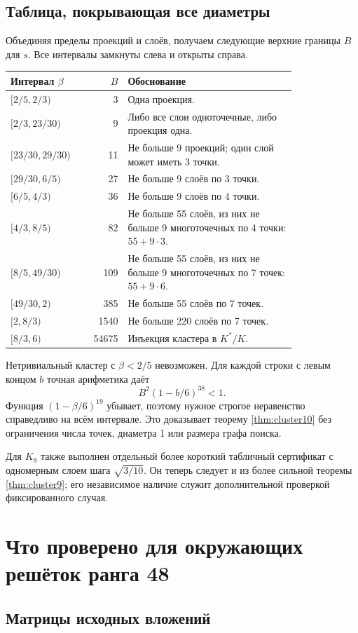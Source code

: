 \documentclass[11pt,a4paper]{article}
\theoremstyle{remark}\newtheorem{remark}[theorem]{Замечание}
\begin{document}
\subsection{Таблица, покрывающая все диаметры}

Объединяя пределы проекций и слоёв, получаем следующие верхние границы $B$ для $s$. Все интервалы замкнуты слева и открыты справа.
\begin{longtable}{P{0.22\linewidth}rP{0.59\linewidth}}
\toprule
Интервал $\beta$ &$B$&Обоснование\\\midrule
\endhead
$[2/5,2/3)$&3&Одна проекция.\\
$[2/3,23/30)$&9&Либо все слои одноточечные, либо проекция одна.\\
$[23/30,29/30)$&11&Не больше 9 проекций; один слой может иметь 3 точки.\\
$[29/30,6/5)$&27&Не больше 9 слоёв по 3 точки.\\
$[6/5,4/3)$&36&Не больше 9 слоёв по 4 точки.\\
$[4/3,8/5)$&82&Не больше 55 слоёв, из них не больше 9 многоточечных по 4 точки: $55+9\cdot3$.\\
$[8/5,49/30)$&109&Не больше 55 слоёв, из них не больше 9 многоточечных по 7 точек: $55+9\cdot6$.\\
$[49/30,2)$&385&Не больше 55 слоёв по 7 точек.\\
$[2,8/3)$&1540&Не больше 220 слоёв по 7 точек.\\
$[8/3,6)$&54675&Инъекция кластера в $K^*/K$.\\
\bottomrule
\end{longtable}
Нетривиальный кластер с $\beta<2/5$ невозможен. Для каждой строки с левым концом $b$ точная арифметика даёт
\[
B^2(1-b/6)^{38}<1.
\]
Функция $(1-\beta/6)^{19}$ убывает, поэтому нужное строгое неравенство справедливо на всём интервале. Это доказывает теорему \ref{thm:cluster10} без ограничения числа точек, диаметра 1 или размера графа поиска.

Для $K_9$ также выполнен отдельный более короткий табличный сертификат с одномерным слоем шага $\sqrt{3/10}$. Он теперь следует и из более сильной теоремы \ref{thm:cluster9}; его независимое наличие служит дополнительной проверкой фиксированного случая.

\section{Что проверено для окружающих решёток ранга 48}

\subsection{Матрицы исходных вложений}
\end{document}
